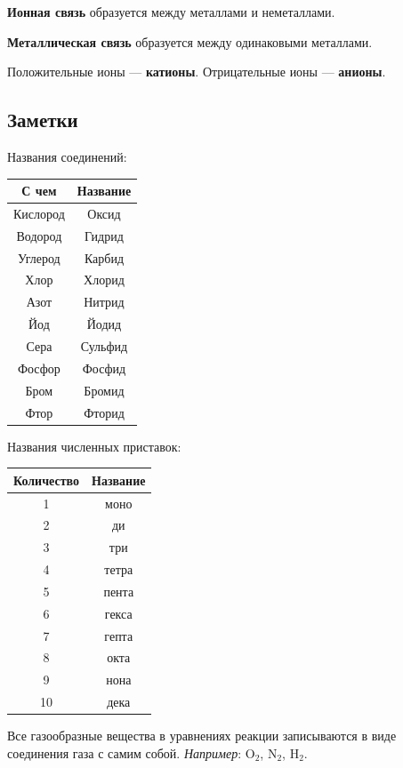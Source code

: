 \documentclass[12pt,a4paper]{article}
\begin{document}
{\bfseries Ионная связь} образуется между металлами и неметаллами.

{\bfseries Металлическая связь} образуется между одинаковыми металлами.

Положительные ионы --- {\bfseries катионы}. Отрицательные ионы --- {\bfseries анионы}.

\subsection{Заметки}

\begin{minipage}{0.4\textwidth}
	Названия соединений:
	
	\noindent\begin{tabular}[t]{|c|c|}
	\hline
	С чем & Название \tabularnewline
	\hline
	Кислород & Оксид \tabularnewline
	Водород & Гидрид \tabularnewline
	Углерод & Карбид \tabularnewline
	Хлор & Хлорид \tabularnewline
	Азот & Нитрид \tabularnewline
	Йод & Йодид \tabularnewline
	Сера & Сульфид \tabularnewline
	Фосфор & Фосфид \tabularnewline
	Бром & Бромид \tabularnewline
	Фтор & Фторид \tabularnewline
	\hline
	\end{tabular}
\end{minipage}
\hfill
\begin{minipage}{0.4\textwidth}
	Названия численных приставок:
	
	\noindent\begin{tabular}[t]{|c|c|}
	\hline
	Количество & Название \tabularnewline
	\hline
	1 & моно \tabularnewline
	2 & ди \tabularnewline
	3 & три \tabularnewline
	4 & тетра \tabularnewline
	5 & пента \tabularnewline
	6 & гекса \tabularnewline
	7 & гепта \tabularnewline
	8 & окта \tabularnewline
	9 & нона \tabularnewline
	10 & дека \tabularnewline
	\hline
	\end{tabular}
\end{minipage}

Все газообразные вещества в уравнениях реакции записываются в виде соединения газа с самим собой. {\itshape Например}: $\mathrm{O_2}$, $\mathrm{N_2}$, $\mathrm{H_2}$.

\end{document}
